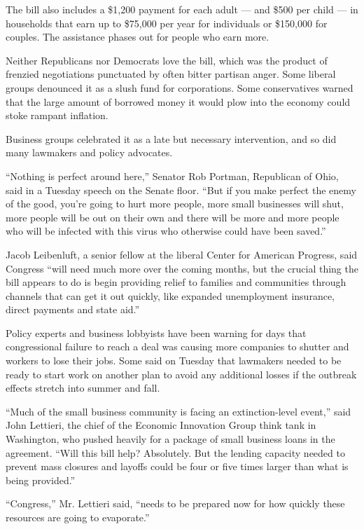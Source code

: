 The bill also includes a \$1,200 payment for each adult --- and \$500
per child --- in households that earn up to \$75,000 per year for
individuals or \$150,000 for couples. The assistance phases out for
people who earn more.

Neither Republicans nor Democrats love the bill, which was the product
of frenzied negotiations punctuated by often bitter partisan anger. Some
liberal groups denounced it as a slush fund for corporations. Some
conservatives warned that the large amount of borrowed money it would
plow into the economy could stoke rampant inflation.

Business groups celebrated it as a late but necessary intervention, and
so did many lawmakers and policy advocates.

``Nothing is perfect around here,'' Senator Rob Portman, Republican of
Ohio, said in a Tuesday speech on the Senate floor. ``But if you make
perfect the enemy of the good, you're going to hurt more people, more
small businesses will shut, more people will be out on their own and
there will be more and more people who will be infected with this virus
who otherwise could have been saved.''

Jacob Leibenluft, a senior fellow at the liberal Center for American
Progress, said Congress ``will need much more over the coming months,
but the crucial thing the bill appears to do is begin providing relief
to families and communities through channels that can get it out
quickly, like expanded unemployment insurance, direct payments and state
aid.''

Policy experts and business lobbyists have been warning for days that
congressional failure to reach a deal was causing more companies to
shutter and workers to lose their jobs. Some said on Tuesday that
lawmakers needed to be ready to start work on another plan to avoid any
additional losses if the outbreak effects stretch into summer and fall.

``Much of the small business community is facing an extinction-level
event,'' said John Lettieri, the chief of the Economic Innovation Group
think tank in Washington, who pushed heavily for a package of small
business loans in the agreement. ``Will this bill help? Absolutely. But
the lending capacity needed to prevent mass closures and layoffs could
be four or five times larger than what is being provided.''

``Congress,'' Mr. Lettieri said, ``needs to be prepared now for how
quickly these resources are going to evaporate.''

